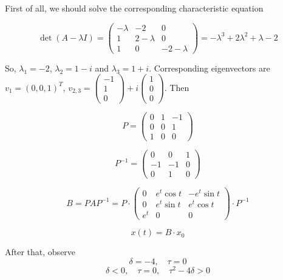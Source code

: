\documentclass[12pt]{article}
\begin{document}
    First of all, we should solve the corresponding
    characteristic equation

    $$
        \det (A - \lambda I) = 
        \begin{pmatrix}
            -\lambda & -2 & 0\\
            1 & 2-\lambda & 0\\
            1 & 0 & -2-\lambda
        \end{pmatrix} =
        -\lambda^3+2\lambda^2+\lambda-2
    $$

    So, $\lambda_1 = -2$, $\lambda_2 = 1-i$
    and $\lambda_3 = 1+i$. Corresponding eigenvectors are 
    $v_1 = (0,0,1)^T$, 
    $
        v_{2,3} = 
        \begin{pmatrix}
            -1\\
            1\\
            0        
        \end{pmatrix} + i
        \begin{pmatrix}
            1\\
            0\\
            0
        \end{pmatrix}
    $. Then

    $$
        P =
        \begin{pmatrix}
            0 & 1 &  -1\\
            0 & 0  &  1\\
            1 & 0  &  0
        \end{pmatrix}
    $$

    $$
        P^{-1} =
        \begin{pmatrix}
            0 & 0 & 1\\
            -1 & -1 & 0\\
            0 & 1 & 0
        \end{pmatrix}
    $$
    
    $$
        B = PAP^{-1} =
        P\cdot
        \begin{pmatrix}
            0 & e^t\cos t & -e^t\sin t\\
            0 & e^t\sin t & e^t\cos t\\
            e^t & 0 & 0
        \end{pmatrix}
        \cdot P^{-1}
    $$

    $$
        x(t) = 
        B\cdot
        x_0
    $$

    After that, observe
    $$
        \delta = -4,\quad\tau = 0
    $$
    $$
        \delta < 0,\quad\tau = 0,\quad
        \tau^2-4\delta>0
    $$
    
\end{document}
